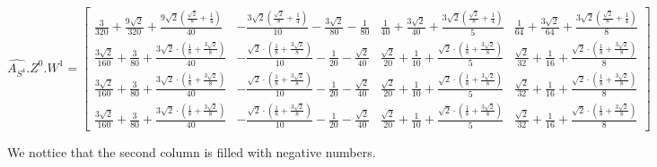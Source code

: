 \documentclass[a4paper]{article}
\begin{document}
$\hat{A_{S^4}}.Z^{0}. W^{1} = 
\left[\begin{matrix}\frac{3}{320} + \frac{9 \sqrt{2}}{320} + \frac{9 \sqrt{2} \left(\frac{\sqrt{2}}{8} + \frac{1}{4}\right)}{40} & - \frac{3 \sqrt{2} \left(\frac{\sqrt{2}}{8} + \frac{1}{4}\right)}{10} - \frac{3 \sqrt{2}}{80} - \frac{1}{80} & \frac{1}{40} + \frac{3 \sqrt{2}}{40} + \frac{3 \sqrt{2} \left(\frac{\sqrt{2}}{8} + \frac{1}{4}\right)}{5} & \frac{1}{64} + \frac{3 \sqrt{2}}{64} + \frac{3 \sqrt{2} \left(\frac{\sqrt{2}}{8} + \frac{1}{4}\right)}{8}\\\frac{3 \sqrt{2}}{160} + \frac{3}{80} + \frac{3 \sqrt{2} \cdot \left(\frac{1}{8} + \frac{3 \sqrt{2}}{8}\right)}{40} & - \frac{\sqrt{2} \cdot \left(\frac{1}{8} + \frac{3 \sqrt{2}}{8}\right)}{10} - \frac{1}{20} - \frac{\sqrt{2}}{40} & \frac{\sqrt{2}}{20} + \frac{1}{10} + \frac{\sqrt{2} \cdot \left(\frac{1}{8} + \frac{3 \sqrt{2}}{8}\right)}{5} & \frac{\sqrt{2}}{32} + \frac{1}{16} + \frac{\sqrt{2} \cdot \left(\frac{1}{8} + \frac{3 \sqrt{2}}{8}\right)}{8}\\\frac{3 \sqrt{2}}{160} + \frac{3}{80} + \frac{3 \sqrt{2} \cdot \left(\frac{1}{8} + \frac{3 \sqrt{2}}{8}\right)}{40} & - \frac{\sqrt{2} \cdot \left(\frac{1}{8} + \frac{3 \sqrt{2}}{8}\right)}{10} - \frac{1}{20} - \frac{\sqrt{2}}{40} & \frac{\sqrt{2}}{20} + \frac{1}{10} + \frac{\sqrt{2} \cdot \left(\frac{1}{8} + \frac{3 \sqrt{2}}{8}\right)}{5} & \frac{\sqrt{2}}{32} + \frac{1}{16} + \frac{\sqrt{2} \cdot \left(\frac{1}{8} + \frac{3 \sqrt{2}}{8}\right)}{8}\\\frac{3 \sqrt{2}}{160} + \frac{3}{80} + \frac{3 \sqrt{2} \cdot \left(\frac{1}{8} + \frac{3 \sqrt{2}}{8}\right)}{40} & - \frac{\sqrt{2} \cdot \left(\frac{1}{8} + \frac{3 \sqrt{2}}{8}\right)}{10} - \frac{1}{20} - \frac{\sqrt{2}}{40} & \frac{\sqrt{2}}{20} + \frac{1}{10} + \frac{\sqrt{2} \cdot \left(\frac{1}{8} + \frac{3 \sqrt{2}}{8}\right)}{5} & \frac{\sqrt{2}}{32} + \frac{1}{16} + \frac{\sqrt{2} \cdot \left(\frac{1}{8} + \frac{3 \sqrt{2}}{8}\right)}{8}\end{matrix}\right]$

We nottice that the second column is filled with negative numbers.
\end{document}
